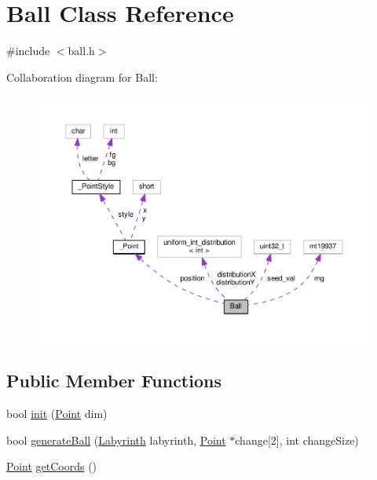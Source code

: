 \hypertarget{class_ball}{\section{Ball Class Reference}
\label{class_ball}
}


{\ttfamily \#include $<$ball.\-h$>$}



Collaboration diagram for Ball\-:
\nopagebreak
\begin{figure}[H]
\begin{center}
\leavevmode
\includegraphics[width=350pt]{class_ball__coll__graph}
\end{center}
\end{figure}
\subsection*{Public Member Functions}
\begin{DoxyCompactItemize}
\item 
bool \hyperlink{class_ball_a1907f13fdfb320a19180efec2a56e39c}{init} (\hyperlink{common_8h_aa9cfdb80b4ca12013a2de8a3b9b97981}{Point} dim)
\item 
bool \hyperlink{class_ball_a60fd40459426366242d18d85b3b50c2c}{generate\-Ball} (\hyperlink{class_labyrinth}{Labyrinth} labyrinth, \hyperlink{common_8h_aa9cfdb80b4ca12013a2de8a3b9b97981}{Point} $\ast$change\mbox{[}2\mbox{]}, int change\-Size)
\item 
\hyperlink{common_8h_aa9cfdb80b4ca12013a2de8a3b9b97981}{Point} \hyperlink{class_ball_a14b9a607402be58e7a0a0ab053df5f82}{get\-Coords} ()
\end{DoxyCompactItemize}
